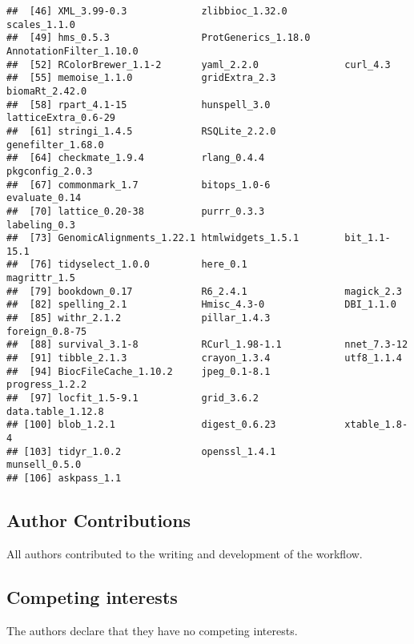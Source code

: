 \documentclass[
]{article}
\begin{document}
\begin{verbatim}
##  [46] XML_3.99-0.3             zlibbioc_1.32.0          scales_1.1.0            
##  [49] hms_0.5.3                ProtGenerics_1.18.0      AnnotationFilter_1.10.0 
##  [52] RColorBrewer_1.1-2       yaml_2.2.0               curl_4.3                
##  [55] memoise_1.1.0            gridExtra_2.3            biomaRt_2.42.0          
##  [58] rpart_4.1-15             hunspell_3.0             latticeExtra_0.6-29     
##  [61] stringi_1.4.5            RSQLite_2.2.0            genefilter_1.68.0       
##  [64] checkmate_1.9.4          rlang_0.4.4              pkgconfig_2.0.3         
##  [67] commonmark_1.7           bitops_1.0-6             evaluate_0.14           
##  [70] lattice_0.20-38          purrr_0.3.3              labeling_0.3            
##  [73] GenomicAlignments_1.22.1 htmlwidgets_1.5.1        bit_1.1-15.1            
##  [76] tidyselect_1.0.0         here_0.1                 magrittr_1.5            
##  [79] bookdown_0.17            R6_2.4.1                 magick_2.3              
##  [82] spelling_2.1             Hmisc_4.3-0              DBI_1.1.0               
##  [85] withr_2.1.2              pillar_1.4.3             foreign_0.8-75          
##  [88] survival_3.1-8           RCurl_1.98-1.1           nnet_7.3-12             
##  [91] tibble_2.1.3             crayon_1.3.4             utf8_1.1.4              
##  [94] BiocFileCache_1.10.2     jpeg_0.1-8.1             progress_1.2.2          
##  [97] locfit_1.5-9.1           grid_3.6.2               data.table_1.12.8       
## [100] blob_1.2.1               digest_0.6.23            xtable_1.8-4            
## [103] tidyr_1.0.2              openssl_1.4.1            munsell_0.5.0           
## [106] askpass_1.1
\end{verbatim}

\hypertarget{author-contributions}{%
\subsection{Author Contributions}\label{author-contributions}}

All authors contributed to the writing and development of the workflow.

\hypertarget{competing-interests}{%
\subsection{Competing interests}\label{competing-interests}}

The authors declare that they have no competing interests.
\end{document}
